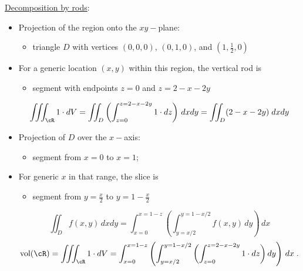 \begin{frame}
\underline{Decomposition by rods}:
\begin{itemize}
  \item Projection of the region onto the $xy-$plane:
  \begin{itemize}
    \item triangle $D$ with vertices $(0,0,0)$, $(0,1,0)$, and $(1,\frac{1}{2},0)$
  \end{itemize}
  \item For a generic location $(x,y)$ within this region, the vertical rod is
  \begin{itemize}
    \item segment with endpoints $z=0$ and $z=2-x-2y$
  \end{itemize}
$$\iiint_{\cR} 1\cdot dV = \iint_D \left( \int_{z=0}^{z=2-x-2y} 1\cdot dz \right) \, dxdy = \iint_D (2-x-2y) \; dxdy$$
%
\item Projection of $D$ over the $x-$axis:
\begin{itemize}
  \item segment from $x=0$ to $x=1$;
\end{itemize}
%
\item For generic $x$ in that range, the slice is
\begin{itemize}
  \item segment from $y=\frac{x}{2}$ to $y=1- \frac{x}{2}$
\end{itemize}
%
$$\iint_{D} f(x,y) \, dxdy = \int_{x=0}^{x=1-z} \left( \int_{y=x/2}^{y=1-x/2} f(x,y)\, dy \right) \, dx$$
%
$$\text{vol}(\cR) = \iiint_{\cR} 1\cdot dV = \int_{x=0}^{x=1-z} \left( \int_{y=x/2}^{y=1-x/2} \left( \int_{z=0}^{z=2-x-2y} 1\cdot dz \right)dy \right) \, dx \; .$$
\end{itemize}

\end{frame} 